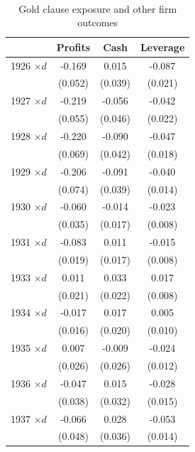 \begin{table}[p]\centering
\caption{\\ Gold clause exposure and other firm outcomes}
\footnotesize \label{tab:othervar} \renewcommand{\arraystretch}{1.2}
\begin{tabular}{lccc}
\toprule
& Profits & Cash & Leverage \\
\midrule
1926 $\times d$ & -0.169\sym{***} & 0.015 & -0.087\sym{***} \\
                & (0.052)         & (0.039) & (0.021) \\
1927 $\times d$ & -0.219\sym{***} & -0.056 & -0.042\sym{*} \\
                & (0.055)         & (0.046) & (0.022) \\
1928 $\times d$ & -0.220\sym{***} & -0.090\sym{**} & -0.047\sym{**} \\
                & (0.069)         & (0.042) & (0.018) \\
1929 $\times d$ & -0.206\sym{**}  & -0.091\sym{**} & -0.040\sym{**} \\
                & (0.074)         & (0.039) & (0.014) \\
1930 $\times d$ & -0.060          & -0.014 & -0.023\sym{**} \\
                & (0.035)         & (0.017) & (0.008) \\
1931 $\times d$ & -0.083\sym{***} & 0.011  & -0.015\sym{*} \\
                & (0.019)         & (0.017) & (0.008) \\
1933 $\times d$ & 0.011           & 0.033  & 0.017\sym{**} \\
                & (0.021)         & (0.022) & (0.008) \\
1934 $\times d$ & -0.017          & 0.017  & 0.005 \\
                & (0.016)         & (0.020) & (0.010) \\
1935 $\times d$ & 0.007           & -0.009 & -0.024\sym{*} \\
                & (0.026)         & (0.026) & (0.012) \\
1936 $\times d$ & -0.047          & 0.015  & -0.028\sym{*} \\
                & (0.038)         & (0.032) & (0.015) \\
1937 $\times d$ & -0.066          & 0.028  & -0.053\sym{***} \\
                & (0.048)         & (0.036) & (0.014) \\

\end{tabular}
\end{table}
